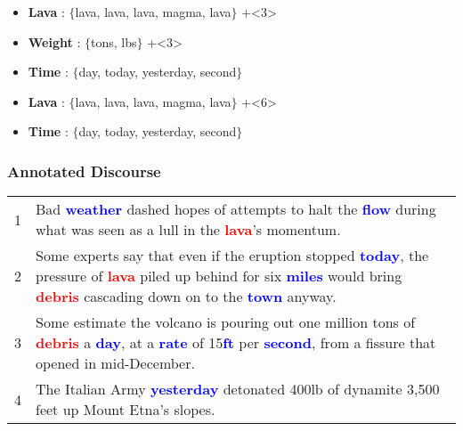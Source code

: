 \documentclass{beamer}
\newcommand{\cent}[1]{\textcolor{red}{#1}}
\newcommand{\chaina}[1]{\textcolor{blue}{#1}}
\begin{document}
\begin{frame}
\begin{columns}
  \end{columns}



  \begin{itemize}
 \onslide+<3> \item \textbf{Lava} : $\{$lava, lava, lava, magma, lava$\}$
 \onslide+<3> \item \textbf{Weight} : $\{$tons, lbs$\}$
 \onslide+<3> \item \textbf{Time} : $\{$day, today, yesterday, second$\}$
  \end{itemize}

\vspace{-4em}
 \begin{itemize}
 \onslide+<6> \item \textbf{Lava} : $\{$lava, lava, lava, magma, lava$\}$
 \onslide+<6> \item \textbf{Time} : $\{$day, today, yesterday, second$\}$
  \end{itemize}


\end{frame}




\begin{frame}
  \frametitle{Annotated Discourse}
  \begin{exampleblock}{}
    \begin{center}
    \begin{tabularx}{\textwidth}{l@{\hspace{0.5em}}X}
1  &    Bad \chaina{\textbf{weather}} dashed hopes of attempts to halt the   \chaina{\textbf{flow}} during
      what was seen as a lull in the \cent{\textbf{lava}}'s momentum. \\
2  &    Some experts say that even if the eruption stopped
      \chaina{\textbf{today}}, the pressure of \cent{\textbf{lava}} piled up behind for
      six \chaina{\textbf{miles}} would bring
      \cent{\textbf{debris}} cascading down on to the \chaina{\textbf{town}} anyway. \\
3  &    Some estimate the volcano is pouring out one million tons of
      \cent{\textbf{debris}} a \chaina{\textbf{day}}, at a \chaina{\textbf{rate}} of 15\chaina{\textbf{ft}}
      per \chaina{\textbf{second}}, from a fissure that
      opened in mid-December. \\
4  &    The Italian Army \chaina{\textbf{yesterday}} detonated 400lb of dynamite
      3,500 feet up Mount Etna's slopes. \\
    \end{tabularx}
    \end{center}
  \end{exampleblock}
\end{frame}
\end{document}
